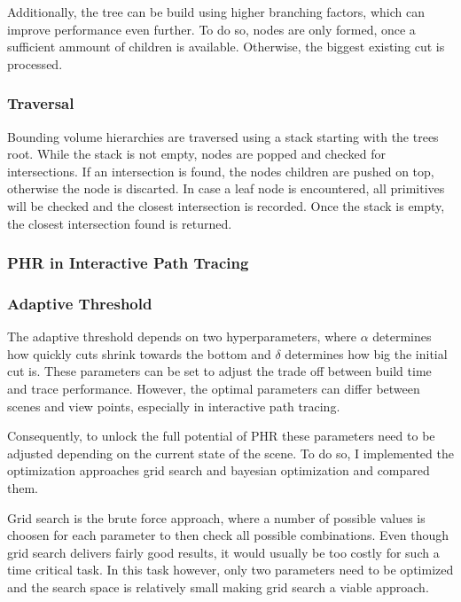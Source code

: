 Additionally, the tree can be build using higher branching factors, which can improve performance even further. To do so, nodes are only formed, once a sufficient ammount of children is available. Otherwise, the biggest existing cut is processed. 

\subsubsection{Traversal}
Bounding volume hierarchies are traversed using a stack starting with the trees root. While the stack is not empty, nodes are popped and checked for intersections. If an intersection is found, the nodes children are pushed on top, otherwise the node is discarted. In case a leaf node is encountered, all primitives will be checked and the closest intersection is recorded. Once the stack is empty, the closest intersection found is returned. 

\subsubsection{PHR in Interactive Path Tracing}

\subsubsection{Adaptive Threshold}
The adaptive threshold depends on two hyperparameters, where $\alpha$ determines how quickly cuts shrink towards the bottom and $\delta$ determines how big the initial cut is. These parameters can be set to adjust the trade off between build time and trace performance. However, the optimal parameters can differ between scenes and view points, especially in interactive path tracing. %

Consequently, to unlock the full potential of PHR these parameters need to be adjusted depending on the current state of the scene. To do so, I implemented the optimization approaches grid search and bayesian optimization and compared them.

Grid search is the brute force approach, where a number of possible values is choosen for each parameter to then check all possible combinations. Even though grid search delivers fairly good results, it would usually be too costly for such a time critical task. In this task however, only two parameters need to be optimized and the search space is relatively small making grid search a viable approach. 

